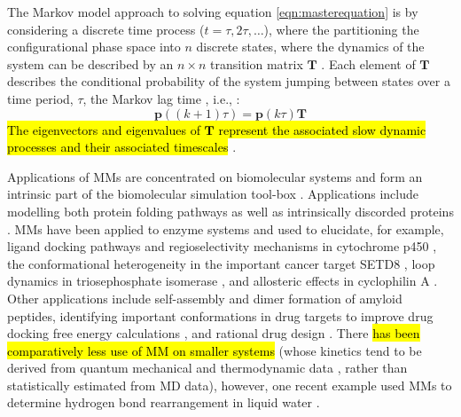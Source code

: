 The Markov model approach to solving equation \ref{eqn:masterequation} is by considering a discrete time process ($t = \tau, 2\tau, \ldots$), where the partitioning the configurational phase space into $n$ discrete states, where the dynamics of the system can be described by an $n\times n$ transition matrix $\mathbf{T}$ \cite{prinzMarkovModelsMolecular2011}. Each element of $\mathbf{T}$ describes the conditional probability of the system jumping between states over a time period, $\tau$, the Markov lag time \cite{prinzMarkovModelsMolecular2011}, i.e., \cite{noeTransitionNetworksModeling2008}: 
\begin{equation}\label{eqn:discretemasterequation}
    \mathbf{p}((k+1)\tau) = \mathbf{p}(k\tau)\mathbf{T}
\end{equation}
\hl{The eigenvectors and eigenvalues of $\mathbf{T}$ represent the associated slow dynamic processes and their associated timescales} \cite{prinzMarkovModelsMolecular2011}. 

Applications of MMs are concentrated on biomolecular systems and form an intrinsic part of the biomolecular simulation tool-box \cite{hugginsBiomolecularSimulationsDynamics2019}. Applications include modelling both protein folding pathways \cite{singhalUsingPathSampling2004,swopeDescribingProteinFolding2004} as well as intrinsically discorded proteins \cite{schorAnalyticalMethodsStructural2016a}. 
MMs have been applied to enzyme systems and used to elucidate, for example, ligand docking pathways \cite{ahalawatMappingSubstrateRecognition2018a} and regioselectivity mechanisms in cytochrome p450 \cite{dodaniDiscoveryRegioselectivitySwitch2016a}, the conformational heterogeneity in the important cancer target SETD8 \cite{chenDynamicConformationalLandscape2019a}, loop dynamics in triosephosphate isomerase \cite{LoopMotionTriosephosphate}, and allosteric effects in cyclophilin A \cite{wapeesittipanAllostericEffectsCyclophilin2019}. Other applications include self-assembly \cite{senguptaAutomatedMarkovState2019} and dimer formation \cite{leahyCoarseMasterEquations2016} of amyloid peptides, identifying important conformations in drug targets to improve drug docking free energy calculations \cite{amaroEnsembleDockingDrug2018}, and rational drug design \cite{gervasioBiomolecularSimulationsStructureBased2019}. There \hl{has been comparatively less use of MM on smaller systems} (whose kinetics tend to be derived from quantum mechanical and thermodynamic data \cite{glowackiMESMEROpenSourceMaster2012, pillingMasterEquationModels2003}, rather than statistically estimated from MD data), however, one recent example used MMs to determine hydrogen bond rearrangement in liquid water \cite{schulzCollectiveHydrogenbondRearrangement2018}. 

